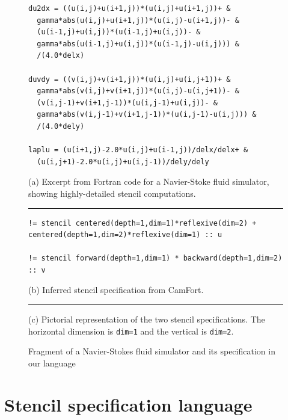 \documentclass[9pt]{sigplanconf}
\theoremstyle{definition}
\begin{document}
\begin{figure}[t]
\begin{verbatim}
du2dx = ((u(i,j)+u(i+1,j))*(u(i,j)+u(i+1,j))+ &
  gamma*abs(u(i,j)+u(i+1,j))*(u(i,j)-u(i+1,j))- &
  (u(i-1,j)+u(i,j))*(u(i-1,j)+u(i,j))- &
  gamma*abs(u(i-1,j)+u(i,j))*(u(i-1,j)-u(i,j))) &
  /(4.0*delx)

duvdy = ((v(i,j)+v(i+1,j))*(u(i,j)+u(i,j+1))+ &
  gamma*abs(v(i,j)+v(i+1,j))*(u(i,j)-u(i,j+1))- &
  (v(i,j-1)+v(i+1,j-1))*(u(i,j-1)+u(i,j))- &
  gamma*abs(v(i,j-1)+v(i+1,j-1))*(u(i,j-1)-u(i,j))) &
  /(4.0*dely)

laplu = (u(i+1,j)-2.0*u(i,j)+u(i-1,j))/delx/delx+ &
  (u(i,j+1)-2.0*u(i,j)+u(i,j-1))/dely/dely
\end{verbatim}
(a) Excerpt from Fortran code for a Navier-Stoke fluid simulator,
showing highly-detailed stencil computations. 
\vspace{0.5em}
\hrule
%
\begin{verbatim}
!= stencil centered(depth=1,dim=1)*reflexive(dim=2) + centered(depth=1,dim=2)*reflexive(dim=1) :: u

!= stencil forward(depth=1,dim=1) * backward(depth=1,dim=2) :: v
\end{verbatim}
(b) Inferred stencil specification from CamFort.
\vspace{0.5em}
\hrule
%
\begin{center}
\end{center}
\vspace{-0.3em}
(c) Pictorial representation of the two stencil specifications.
The horizontal dimension is \texttt{dim=1} and the vertical is \texttt{dim=2}.
\caption{Fragment of a Navier-Stokes fluid simulator and its
  specification in our language}
\label{ref:navier-stokes-fragment}
\end{figure}

\section{Stencil specification language}
\label{sec:lang}
\end{document}
